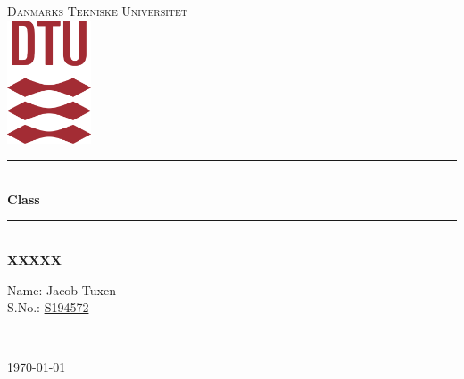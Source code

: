 \begin{titlepage}
	\newcommand{\HRule}{\textcolor{doc}{\rule{\linewidth}{1mm}}} %

	\center %

	\textsc{\LARGE Danmarks Tekniske Universitet}\\[1.5cm] %

	\includegraphics[width=25mm]{graphics/DTU_logo.png}\\[1.5cm]

	
	\HRule\\[0.5cm]

	{\huge\bfseries Class}\\[0.4cm] %

	\HRule\\[0.5cm]

	{\huge\bfseries XXXXX}\\[0.4cm] %

	\begin{minipage}{0.4\textwidth}
			\begin{flushleft}
					Name: Jacob Tuxen \\
					S.No.: \underline{S194572}\\[0.5cm] %
			\end{flushleft}
	\end{minipage}
	~
	\vfill


	\vfill\vfill\vfill %

	{\large\today} %

	\vfill %

\end{titlepage}